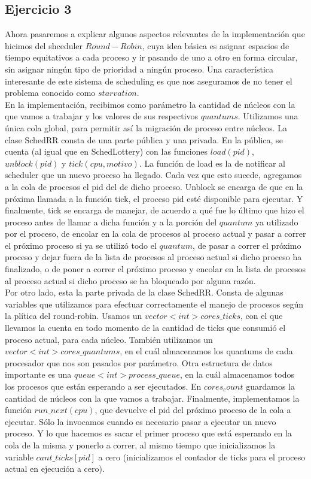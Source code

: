\documentclass[a4paper]{article}
\begin{document}
\subsection{Ejercicio 3}
Ahora pasaremos a explicar algunos aspectos relevantes de la implementaci\'on que hicimos del shceduler
$Round-Robin$, cuya idea b\'asica es asignar espacios de tiempo equitativos a cada proceso y ir pasando
de uno a otro en forma circular, sin asignar ning\'un tipo de prioridad a ning\'un proceso. Una
caracter\'istica interesante de este sistema de scheduling es que nos aseguramos de no tener el problema
conocido como $starvation$. \\
En la implementaci\'on, recibimos como par\'ametro la cantidad de n\'ucleos con la que vamos a trabajar
y los valores de sus respectivos $quantums$. Utilizamos una \'unica cola global, para permitir as\'i la
migraci\'on de proceso entre n\'ucleos. La clase SchedRR consta de una parte p\'ublica y una privada. En 
la p\'ublica, se cuenta (al igual que en SchedLottery) con las funciones $load(pid)$, $unblock(pid)$ 
y $tick(cpu, motivo)$. La funci\'on de load es la de notificar al scheduler que un nuevo proceso ha llegado.
Cada vez que esto sucede, agregamos a la cola de procesos el pid del de dicho proceso. Unblock se encarga 
de que en la pr\'oxima llamada a la funci\'on tick, el proceso pid est\'e disponible para ejecutar. Y 
finalmente, tick se encarga de manejar, de acuerdo a qu\'e fue lo \'ultimo que hizo el proceso antes de llamar
a dicha funci\'on y a la porci\'on del $quantum$ ya utilizado por el proceso, de encolar en la cola de procesos
al proceso actual y pasar a correr el pr\'oximo proceso si ya se utiliz\'o todo el $quantum$, de pasar a correr 
el pr\'oximo proceso y dejar fuera de la lista de procesos al proceso actual si dicho proceso ha finalizado, o de
poner a correr el pr\'oximo proceso y encolar en la lista de procesos al proceso actual si dicho proceso se ha
bloqueado por alguna raz\'on. \\
Por otro lado, esta la parte privada de la clase SchedRR. Consta de algunas variables que utilizamos para efectuar
correctamente el manejo de procesos seg\'un la pl\'itica del round-robin. Usamos un $vector<int> cores\_ticks$, 
con el que llevamos la cuenta en todo momento de la cantidad de ticks que consumi\'o el proceso actual, 
para cada n\'ucleo. Tambi\'en utilizamos un $vector<int> cores\_quantums$, en el cu\'al almacenamos los quantums
de cada procesador que nos son pasados por par\'ametro. Otra estructura de datos importante es una
$queue<int> process\_queue$, en la cu\'al almacenamos todos los procesos que est\'an esperando a ser ejecutados.
En $cores_count$ guardamos la cantidad de n\'ucleos con la que vamos a trabajar. Finalmente, implementamos la
funci\'on $run\_next(cpu)$, que devuelve el pid del pr\'oximo proceso de la cola a ejecutar. S\'olo la invocamos
cuando es necesario pasar a ejecutar un nuevo proceso. Y lo que hacemos es sacar el primer proceso que est\'a 
esperando en la cola de la misma y ponerlo a correr, al mismo tiempo que inicializamos la variable
$cant\_ticks[pid]$ a cero (inicializamos el contador de ticks para el proceso actual en ejecuci\'on a cero). \\
\end{document}
